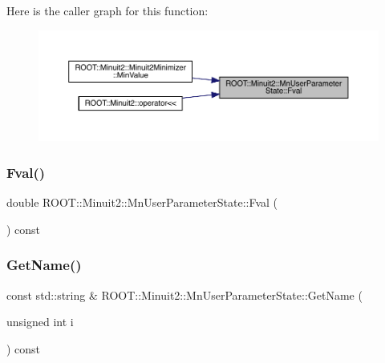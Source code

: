 Here is the caller graph for this function\+:\nopagebreak
\begin{figure}[H]
\begin{center}
\leavevmode
\includegraphics[width=350pt]{d3/de0/classROOT_1_1Minuit2_1_1MnUserParameterState_ab231f5e0a1fa3314210f7849ab382b86_icgraph}
\end{center}
\end{figure}
\mbox{\label{classROOT_1_1Minuit2_1_1MnUserParameterState_ab231f5e0a1fa3314210f7849ab382b86}} 
\subsubsection{\texorpdfstring{Fval()}{Fval()}\hspace{0.1cm}{\footnotesize\ttfamily [2/2]}}
{\footnotesize\ttfamily double R\+O\+O\+T\+::\+Minuit2\+::\+Mn\+User\+Parameter\+State\+::\+Fval (\begin{DoxyParamCaption}{ }\end{DoxyParamCaption}) const\hspace{0.3cm}{\ttfamily [inline]}}

\mbox{\label{classROOT_1_1Minuit2_1_1MnUserParameterState_a491c35a111b242ee53a8c150b53da67b}} 
\subsubsection{\texorpdfstring{GetName()}{GetName()}\hspace{0.1cm}{\footnotesize\ttfamily [1/2]}}
{\footnotesize\ttfamily const std\+::string \& R\+O\+O\+T\+::\+Minuit2\+::\+Mn\+User\+Parameter\+State\+::\+Get\+Name (\begin{DoxyParamCaption}\item[{unsigned int}]{i }\end{DoxyParamCaption}) const}


